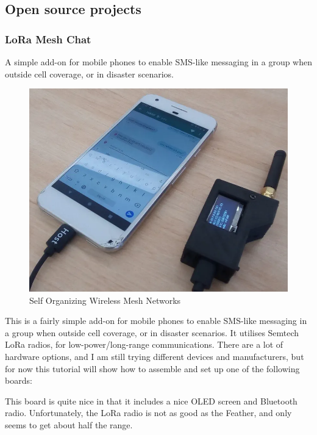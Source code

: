 		\subsection{Open source projects}
		

			\subsubsection{LoRa Mesh Chat}
			
				A simple add-on for mobile phones to enable SMS-like messaging in a group when outside cell coverage, or in disaster scenarios.
				
				\noindent
				\begin{minipage}{0.48\textwidth}%
					\begin{figure}[H]
						\centering
						\includegraphics[width=\textwidth]{resources/img/chap4/lora-mesh-chat-5267d9}
						\caption[Self Organizing Wireless Mesh Networks]{Self Organizing Wireless Mesh Networks\cite{BADIS2015653}}
						\label{img:wms_microsoft}
					\end{figure}
				\end{minipage}%
				\hfill%
				\begin{minipage}{0.5\textwidth}\raggedright
					This is a fairly simple add-on for mobile phones to enable SMS-like messaging in a group when outside cell coverage, or in disaster scenarios. It utilises Semtech LoRa radios, for low-power/long-range communications. There are a lot of hardware options, and I am still trying different devices and manufacturers, but for now this tutorial will show how to assemble and set up one of the following boards:
					
					This board is quite nice in that it includes a nice OLED screen and Bluetooth radio. Unfortunately, the LoRa radio is not as good as the Feather, and only seems to get about half the range.
				\end{minipage}
			
